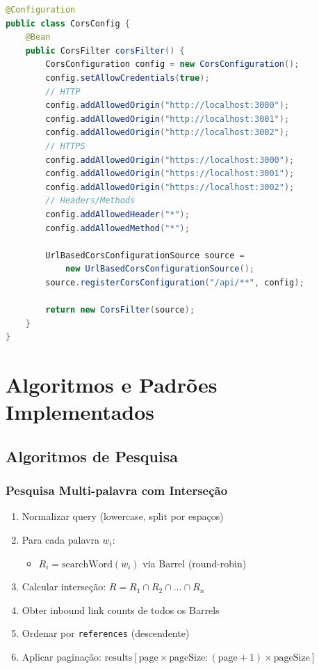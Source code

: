 \documentclass[12pt,a4paper]{article}
\begin{document}
\begin{lstlisting}[language=Java, caption={Configuração CORS}]
@Configuration
public class CorsConfig {
    @Bean
    public CorsFilter corsFilter() {
        CorsConfiguration config = new CorsConfiguration();
        config.setAllowCredentials(true);
        // HTTP
        config.addAllowedOrigin("http://localhost:3000");
        config.addAllowedOrigin("http://localhost:3001");
        config.addAllowedOrigin("http://localhost:3002");
        // HTTPS
        config.addAllowedOrigin("https://localhost:3000");
        config.addAllowedOrigin("https://localhost:3001");
        config.addAllowedOrigin("https://localhost:3002");
        // Headers/Methods
        config.addAllowedHeader("*");
        config.addAllowedMethod("*");
        
        UrlBasedCorsConfigurationSource source = 
            new UrlBasedCorsConfigurationSource();
        source.registerCorsConfiguration("/api/**", config);
        
        return new CorsFilter(source);
    }
}
\end{lstlisting}

\newpage

\section{Algoritmos e Padrões Implementados}

\subsection{Algoritmos de Pesquisa}

\subsubsection{Pesquisa Multi-palavra com Interseção}
\begin{enumerate}
    \item Normalizar query (lowercase, split por espaços)
    \item Para cada palavra $w_i$:
    \begin{itemize}
        \item $R_i = \text{searchWord}(w_i)$ via Barrel (round-robin)
    \end{itemize}
    \item Calcular interseção: $R = R_1 \cap R_2 \cap \ldots \cap R_n$
    \item Obter inbound link counts de todos os Barrels
    \item Ordenar por \texttt{references} (descendente)
    \item Aplicar paginação: $\text{results}[\text{page} \times \text{pageSize} : (\text{page}+1) \times \text{pageSize}]$
\end{enumerate}
\end{document}
